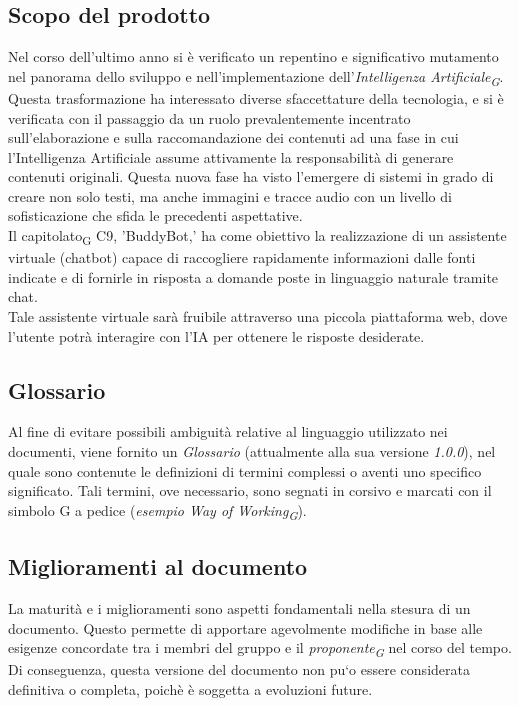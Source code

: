 \subsection{Scopo del prodotto}
Nel corso dell'ultimo anno si è verificato un repentino e significativo mutamento nel panorama
dello sviluppo e nell'implementazione dell'\textit{Intelligenza Artificiale\textsubscript{G}}.
Questa trasformazione ha interessato diverse sfaccettature della tecnologia, e si è verificata con il passaggio da un
ruolo prevalentemente incentrato sull'elaborazione e sulla raccomandazione dei contenuti ad
una fase in cui l'Intelligenza Artificiale assume attivamente la responsabilità di generare
contenuti originali. Questa nuova fase ha visto l'emergere di sistemi in grado di creare non
solo testi, ma anche immagini e tracce audio con un livello di sofisticazione che sfida le
precedenti aspettative. \\
Il capitolato\textsubscript{G} C9, 'BuddyBot,' ha come obiettivo la realizzazione di un assistente virtuale (chatbot) 
capace di raccogliere rapidamente informazioni dalle fonti indicate e di fornirle in risposta a domande poste in 
linguaggio naturale tramite chat.\\
Tale assistente virtuale sarà fruibile attraverso una piccola piattaforma web, dove l'utente potrà interagire con l'IA 
per ottenere le risposte desiderate.

\subsection{Glossario}
Al fine di evitare possibili ambiguità relative al linguaggio utilizzato nei documenti, viene fornito un \textit{Glossario}
(attualmente alla sua versione \textit{1.0.0}), nel quale sono contenute le definizioni di termini complessi o aventi uno 
specifico significato. Tali termini, ove necessario, sono segnati in corsivo e marcati con il simbolo G a pedice
(\textit{esempio Way of Working\textsubscript{G}}).

\subsection{Miglioramenti al documento}
La maturità e i miglioramenti sono aspetti fondamentali nella stesura di un documento.
Questo permette di apportare agevolmente modifiche in base alle esigenze concordate tra i
membri del gruppo e il \textit{proponente\textsubscript{G}} nel corso del tempo. Di conseguenza, questa versione del
documento non pu`o essere considerata definitiva o completa, poichè è soggetta a evoluzioni future.

